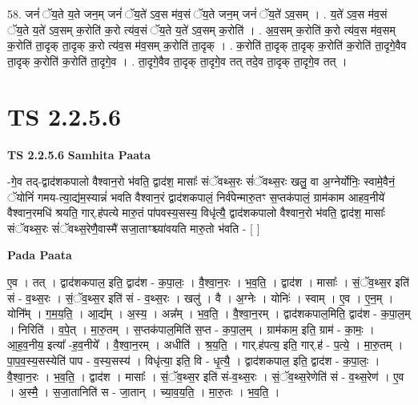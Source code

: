 \documentclass[17pt]{extarticle}
\begin{document}
58. जनं॑ ॅय॒ते य॒ते जन॒म् जनं॑ ॅय॒ते॑ ऽव॒स म॑व॒सं ॅय॒ते जन॒म् जनं॑ ॅय॒ते॑ ऽव॒सम् । . य॒ते॑ ऽव॒स म॑व॒सं ॅय॒ते य॒ते॑ ऽव॒सम् क॒रोति॑ क॒रो त्य॑व॒सं ॅय॒ते य॒ते॑ ऽव॒सम् क॒रोति॑ । . अ॒व॒सम् क॒रोति॑ क॒रो त्य॑व॒स म॑व॒सम् क॒रोति॑ ता॒दृक् ता॒दृक् क॒रो त्य॑व॒स म॑व॒सम् क॒रोति॑ ता॒दृक् । . क॒रोति॑ ता॒दृक् ता॒दृक् क॒रोति॑ क॒रोति॑ ता॒दृगे॒वैव ता॒दृक् क॒रोति॑ क॒रोति॑ ता॒दृगे॒व । . ता॒दृगे॒वैव ता॒दृक् ता॒दृगे॒व तत् तदे॒व ता॒दृक् ता॒दृगे॒व तत् । \newline
\pagebreak
{}
\section*{ TS 2.2.5.6 }

\textbf{TS 2.2.5.6 } \newline
\textbf{Samhita Paata} \newline

-गे॒व तद्-द्वाद॑शकपालो वैश्वान॒रो भ॑वति॒ द्वाद॑श॒ मासाः᳚ संॅवथ्स॒रः सं॑ॅवथ्स॒रः खलु॒ वा अ॒ग्नेर्योनिः॒ स्वामे॒वैनं॒ ॅयोनिं॑ गमय-त्या॒द्य॑म॒स्यान्नं॑ भवति वैश्वान॒रं द्वाद॑शकपालं॒ निर्व॑पेन्मारु॒तꣳ स॒प्तक॑पालं॒ ग्राम॑काम आहव॒नीये॑ वैश्वान॒रमधि॑ श्रयति॒ गार्.ह॑पत्ये मारु॒तं पा॑पवस्य॒सस्य॒ विधृ॑त्यै॒ द्वाद॑शकपालो वैश्वान॒रो भ॑वति॒ द्वाद॑श॒ मासाः᳚ संॅवथ्स॒रः सं॑ॅवथ्स॒रेणै॒वास्मै॑ सजा॒ताꣳश्च्या॑वयति मारु॒तो भ॑वति - [  ] \newline

\textbf{Pada Paata} \newline

ए॒व । तत् । द्वाद॑शकपाल॒ इति॒ द्वाद॑श - क॒पा॒लः॒ । वै॒श्वा॒न॒रः । भ॒व॒ति॒ । द्वाद॑श । मासाः᳚ । सं॒ॅव॒थ्स॒र इति॑ सं - व॒थ्स॒रः । सं॒ॅव॒थ्स॒र इति॑ सं - व॒थ्स॒रः । खलु॑ । वै । अ॒ग्नेः । योनिः॑ । स्वाम् । ए॒व । ए॒न॒म् । योनि᳚म् । ग॒म॒य॒ति॒ । आ॒द्य᳚म् । अ॒स्य॒ । अन्न᳚म् । भ॒व॒ति॒ । वै॒श्वा॒न॒रम् । द्वाद॑शकपाल॒मिति॒ द्वाद॑श - क॒पा॒ल॒म् । निरिति॑ । व॒पे॒त् । मा॒रु॒तम् । स॒प्तक॑पाल॒मिति॑ स॒प्त - क॒पा॒ल॒म् । ग्राम॑काम॒ इति॒ ग्राम॑ - का॒मः॒ । आ॒ह॒व॒नीय॒ इत्या᳚ -ह॒व॒नीये᳚ । वै॒श्वा॒न॒रम् । अधीति॑ । श्र॒य॒ति॒ । गार्.ह॑पत्य॒ इति॒ गार्.ह॑ - प॒त्ये॒ । मा॒रु॒तम् । पा॒प॒व॒स्य॒सस्येति॑ पाप - व॒स्य॒सस्य॑ । विधृ॑त्या॒ इति॒ वि - धृ॒त्यै॒ । द्वाद॑शकपाल॒ इति॒ द्वाद॑श - क॒पा॒लः॒ । वै॒श्वा॒न॒रः । भ॒व॒ति॒ । द्वाद॑श । मासाः᳚ । सं॒ॅव॒थ्स॒र इति॑ सं-व॒थ्स॒रः । सं॒ॅव॒थ्स॒रेणेति॑ सं - व॒थ्स॒रेण॑ । ए॒व । अ॒स्मै॒ । स॒जा॒तानिति॑ स - जा॒तान् । च्या॒व॒य॒ति॒ । मा॒रु॒तः । भ॒व॒ति॒ ।  \newline
\end{document}
